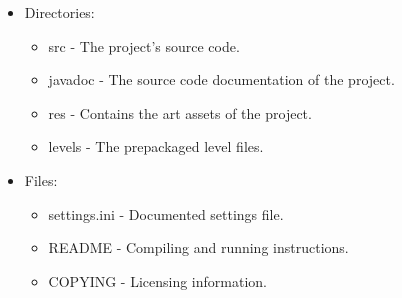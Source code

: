 \documentclass[a4paper,10pt]{article}
\begin{document}
\begin{itemize}
  \item Directories:
  
  \begin{itemize}
  \item src - The project's source code.
  \item javadoc - The source code documentation of the project.
  \item res - Contains the art assets of the project.
  \item levels - The prepackaged level files.
  \end{itemize}
  
  \item Files:
  
  \begin{itemize}
  \item settings.ini - Documented settings file.
  \item README - Compiling and running instructions.
  \item COPYING - Licensing information.
  \end{itemize}
\end{itemize}
\end{document}

